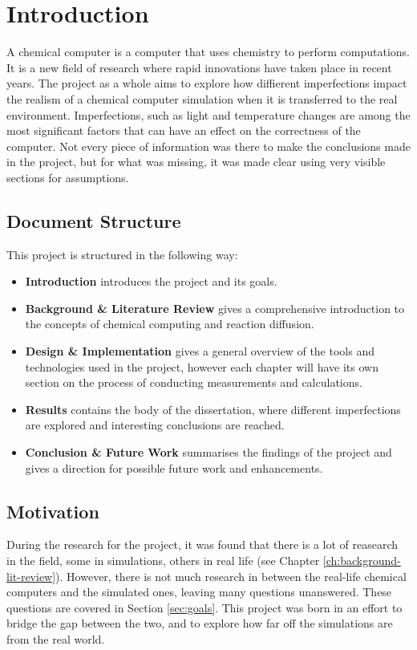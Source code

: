 \chapter{Introduction}

A chemical computer is a computer that uses chemistry to perform computations. It is a new field of research where rapid innovations have taken place in recent years.
The project as a whole aims to explore how diffierent imperfections impact the realism of a chemical computer simulation when it is transferred to the real environment. 
Imperfections, such as light and temperature changes are among the most significant factors that can have an effect on the correctness of the computer.
Not every piece of information was there to make the conclusions made in the project, but for what was missing, it was made clear using very visible sections for assumptions.

\section{Document Structure}
This project is structured in the following way:

\begin{itemize}
    \item \textbf{Introduction} introduces the project and its goals.
    \item \textbf{Background \& Literature Review} gives a comprehensive introduction to the concepts of chemical computing and reaction diffusion.
    \item \textbf{Design \& Implementation} gives a general overview of the tools and technologies used in the project, however each chapter will have its own section on the process of conducting measurements and calculations.
    \item \textbf{Results} contains the body of the dissertation, where different imperfections are explored and interesting conclusions are reached.
    \item \textbf{Conclusion \& Future Work} summarises the findings of the project and gives a direction for possible future work and enhancements.
\end{itemize}

\section{Motivation}
During the research for the project, it was found that there is a lot of reasearch in the field, some in simulations, others in real life (see Chapter \ref{ch:background-lit-review}). 
However, there is not much research in between the real-life chemical computers and the simulated ones, leaving many questions unanswered. These questions are covered in Section \ref{sec:goals}.
This project was born in an effort to bridge the gap between the two, and to explore how far off the simulations are from the real world.


